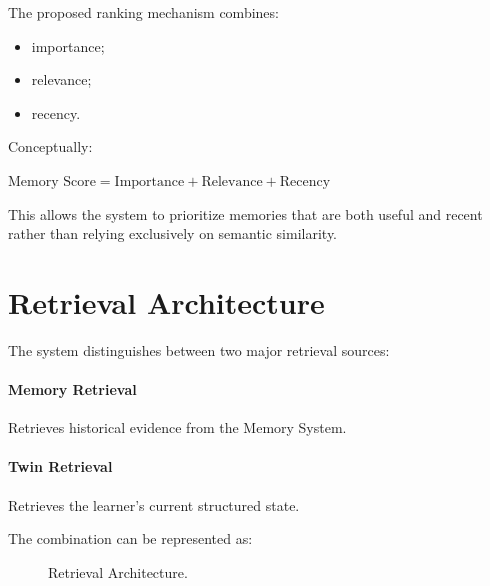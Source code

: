 \documentclass[12pt,a4paper]{article}
\begin{document}
The proposed ranking mechanism combines:
\begin{itemize}[noitemsep,topsep=2pt]
    \item importance;
    \item relevance;
    \item recency.
\end{itemize}

Conceptually:
\begin{center}
$\text{Memory Score} = \text{Importance} + \text{Relevance} + \text{Recency}$
\end{center}

This allows the system to prioritize memories that are both useful and recent rather than relying exclusively on semantic similarity.

\section{Retrieval Architecture}
The system distinguishes between two major retrieval sources:

\paragraph{Memory Retrieval} Retrieves historical evidence from the Memory System.

\paragraph{Twin Retrieval} Retrieves the learner's current structured state.

The combination can be represented as:

\begin{figure}[htbp]
\centering
{}
\caption{Retrieval Architecture.}
\end{figure}
\end{document}
